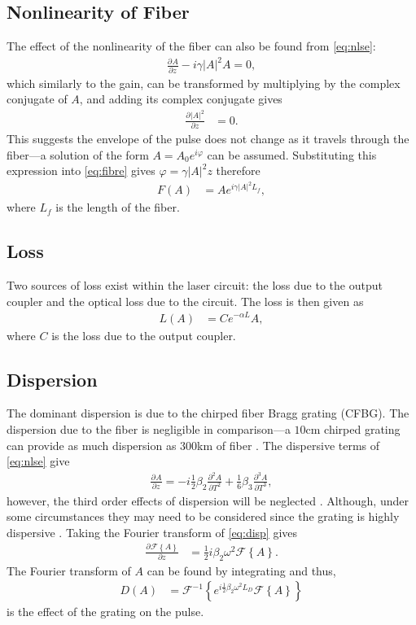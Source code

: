 \documentclass[12pt]{article}
\newcommand{\pdiff}[3][]{\frac{\partial^{#1}#2}{\partial{#3}^{#1}}}
\newcommand{\FT}[1]{\mathcal{F}\left\{ #1 \right\}}
\newcommand{\FTi}[1]{\mathcal{F}^{-1}\left\{ #1 \right\}}
\begin{document}
\subsection{Nonlinearity of Fiber}
The effect of the nonlinearity of the fiber can also be found from \eqref{eq:nlse}:
\begin{align*}
\pdiff{A}{z} - i \gamma |A|^2 A = 0,
\end{align*}
which similarly to the gain, can be transformed by multiplying by the complex conjugate of $A$, and adding its complex conjugate gives
\begin{align}
\label{eq:fibre}
\pdiff{|A|^2}{z} &= 0.
\end{align}
This suggests the envelope of the pulse does not change as it travels through the fiber---a solution of the form $A = A_0 e^{i \varphi}$ can be assumed. Substituting this expression into \eqref{eq:fibre} gives $\varphi = \gamma |A|^2 z$ therefore
\begin{align*}
F(A) &= A e^{i \gamma |A|^2 L_f},
\end{align*}
where $L_f$ is the length of the fiber.

\subsection{Loss}
Two sources of loss exist within the laser circuit: the loss due to the output coupler and the optical loss due to the circuit. The loss is then given as
\begin{align*}
L(A) &= C e^{- \alpha L}A,
\end{align*}
where $C$ is the loss due to the output coupler.

\subsection{Dispersion}
The dominant dispersion is due to the chirped fiber Bragg grating (CFBG). The dispersion due to the fiber is negligible in comparison---a $10$cm chirped grating can provide as much dispersion as $300$km of fiber \cite{agrawal2002}. The dispersive terms of \eqref{eq:nlse} give
\begin{align}
\label{eq:disp}
\pdiff{A}{z} = -i \frac{1}{2} \beta_2 \pdiff[2]{A}{T} + \frac{1}{6} \beta_3 \pdiff[3]{A}{T},
\end{align}
however, the third order effects of dispersion will be neglected \cite{agrawal2013, ferreira}. Although, under some circumstances they may need to be considered since the grating is highly dispersive \cite{agrawal2013, litchinitser}. Taking the Fourier transform of \eqref{eq:disp} gives
\begin{align*}
\pdiff{\FT{A}}{z} &= \frac{1}{2} i \beta_2 \omega^2 \FT{A}.
\end{align*}
The Fourier transform of $A$ can be found by integrating and thus,
\begin{align*}
D(A) &= \FTi{e^{i \frac{1}{2} \beta_2 \omega^2 L_D} \FT{A}}
\end{align*}
is the effect of the grating on the pulse.
\end{document}
